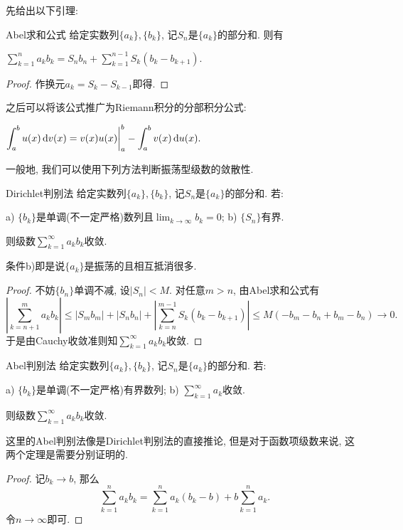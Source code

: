 先给出以下引理: 

\begin{lemma}{Abel求和公式}
	给定实数列$\{ a_k \},\{ b_k \}$, 记$S_n$是$\{ a_k \}$的部分和. 则有
	\begin{center}
		$\displaystyle \sum_{k=1}^{n} a_kb_k = S_nb_n + \sum_{k=1}^{n-1}S_k(b_k-b_{k+1}). $
	\end{center}
\end{lemma}
\begin{proof}
	作换元$a_k=S_k-S_{k-1}$即得. 
\end{proof}
\begin{remark}
	之后可以将该公式推广为Riemann积分的分部积分公式: 
	\begin{center}
		$\displaystyle \int_{a}^{b} u(x)\mathop{}\!\mathrm{d} v(x) = v(x)u(x) \bigg|_{a}^{b} - \int_{a}^{b} v(x) \mathop{}\!\mathrm{d} u(x). $
	\end{center}
\end{remark}

一般地, 我们可以使用下列方法判断振荡型级数的敛散性. 

\begin{theorem}{Dirichlet判别法}
	给定实数列$\{ a_k \},\{ b_k \}$, 记$S_n$是$\{ a_k \}$的部分和. 若: 

	a) $\{ b_k \}$是单调(不一定严格)数列且$\lim_{k\to \infty} b_k = 0$;  \qquad b) $\{ S_n \}$有界. 
	
	\noindent
	则级数$\sum_{k=1}^{\infty} a_kb_k$收敛. 
\end{theorem}
\begin{remark}
	条件b)即是说$\{ a_k \}$是振荡的且相互抵消很多. 
\end{remark}
\begin{proof}
	不妨$\{ b_n \}$单调不减, 设$|S_n|<M$. 对任意$m>n$, 由Abel求和公式有$$\left| \sum_{k=n+1}^{m} a_kb_k \right| \leq |S_mb_m|+|S_nb_n|+\left| \sum_{k=n}^{m-1}S_k(b_k-b_{k+1}) \right| \leq M(-b_m-b_n + b_m-b_n) \to 0. $$
	于是由Cauchy收敛准则知$\sum_{k=1}^{\infty} a_kb_k$收敛. 
\end{proof}

\begin{corollary}{Abel判别法}
	给定实数列$\{ a_k \},\{ b_k \}$, 记$S_n$是$\{ a_k \}$的部分和. 若: 
	
	a) $\{ b_k \}$是单调(不一定严格)有界数列; \qquad b) $\sum_{k=1}^{\infty} a_k$收敛. 
	
	\noindent
	则级数$\sum_{k=1}^{\infty} a_kb_k$收敛. 
\end{corollary}
\begin{remark}
	这里的Abel判别法像是Dirichlet判别法的直接推论, 但是对于函数项级数来说, 这两个定理是需要分别证明的. 
\end{remark}
\begin{proof}
	记$b_k\to b$, 那么$$\sum_{k=1}^{n}a_kb_k = \sum_{k=1}^{n}a_k(b_k-b) + b\sum_{k=1}^{n}a_k.$$
	令$n \to \infty$即可. 
\end{proof}

